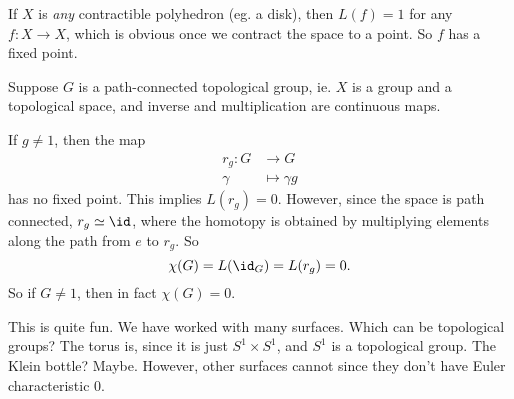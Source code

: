 \documentclass[a4paper]{article}
\begin{document}
\begin{eg}
  If $X$ is \emph{any} contractible polyhedron (eg. a disk), then $L(f) = 1$ for any $f: X \to X$, which is obvious once we contract the space to a point. So $f$ has a fixed point.
\end{eg}

\begin{eg}
  Suppose $G$ is a path-connected topological group, ie. $X$ is a group and a topological space, and inverse and multiplication are continuous maps.

  If $g \not= 1$, then the map
  \begin{align*}
    r_g: G &\to G\\
    \gamma &\mapsto \gamma g
  \end{align*}
  has no fixed point. This implies $L(r_g) = 0$. However, since the space is path connected, $r_g \simeq \id$, where the homotopy is obtained by multiplying elements along the path from $e$ to $r_g$. So
  \[
    \chi(G) = L(\id_G) = L(r_g) = 0.
  \]
  So if $G \not= 1$, then in fact $\chi(G) = 0$.
\end{eg}
This is quite fun. We have worked with many surfaces. Which can be topological groups? The torus is, since it is just $S^1 \times S^1$, and $S^1$ is a topological group. The Klein bottle? Maybe. However, other surfaces cannot since they don't have Euler characteristic $0$.
\end{document}
